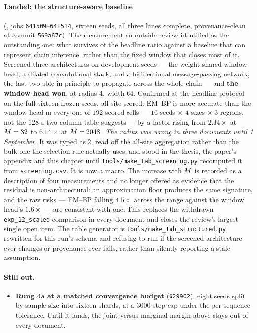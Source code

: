 \paragraph{Landed: the structure-aware baseline}
(, jobs
\texttt{641509}--\texttt{641514}, sixteen seeds, all three lanes complete,
provenance-clean at commit \texttt{569a67c}). The measurement an outside review
identified as the outstanding one: what survives of the headline ratio against
a baseline that can represent chain inference, rather than the fixed window
that closes most of it. Screened three architectures on development seeds ---
the weight-shared window head, a dilated convolutional stack, and a
bidirectional message-passing network, the last two able in principle to
propagate across the whole chain --- and \textbf{the window head won}, at
radius $4$, width $64$. Confirmed at the headline protocol on the full sixteen
frozen seeds, all-site scored: EM--BP is more accurate than the window head in
every one of $192$ scored cells --- $16$ seeds $\times$ $4$ sizes $\times$ $3$
regions, not the $128$ a two-column table suggests --- by a factor rising from
$2.34\times$ at $M=32$ to $6.14\times$ at $M=2048$. \emph{The radius was
wrong in three documents until 1 September.} It was typed as $2$, read off the
all-site aggregation rather than the bulk one the selection rule actually uses,
and stood in the thesis, the paper's appendix and this chapter until
\texttt{tools/make\_tab\_screening.py} recomputed it from
\texttt{screening.csv}. It is now a macro. The increase with $M$ is
recorded as a description of four measurements and no longer offered as evidence
that the residual is non-architectural: an approximation floor produces the same
signature, and the raw risks --- EM--BP falling $4.5\times$ across the range
against the window head's $1.6\times$ --- are consistent with one. This
replaces the withdrawn \texttt{exp\_12\_scaled} comparison in every document
and closes the review's largest single open item. The table generator is
\texttt{tools/make\_tab\_structured.py}, rewritten for this run's schema and
refusing to run if the screened architecture ever changes or provenance ever
fails, rather than silently reporting a stale assumption.

\paragraph{Still out.}
\begin{itemize}\itemsep3pt
\item \textbf{Rung 4a at a matched convergence budget} (\texttt{629962}), eight seeds split by
      sample size into sixteen shards, at a $3000$-step cap under the per-sequence tolerance. Until
      it lands, the joint-versus-marginal margin above stays out of every document.
\end{itemize}

